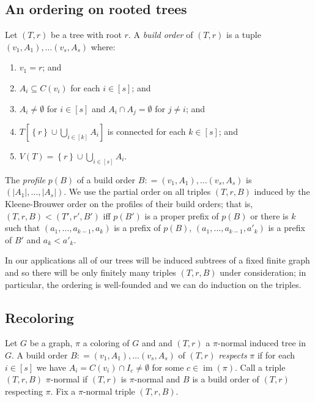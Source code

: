 \documentclass[12pt]{article}
\theoremstyle{plain}
\theoremstyle{definition}
\theoremstyle{remark}
\newcommand{\set}[1]{\left\{ #1 \right\}}
\newcommand{\card}[1]{\left|#1\right|}
\newcommand{\irange}[1]{\left[#1\right]}
\newcommand{\brackets}[1]{\left[ #1 \right]}
\newcommand{\DefinedAs}{\mathrel{\mathop:}=}
\newcommand{\im}{\operatorname{im}}
\begin{document}
\subsection{An ordering on rooted trees}
Let $(T,r)$ be a tree with root $r$.  A \emph{build order} of $(T,r)$ is a tuple $(v_1,A_1), \ldots (v_s, A_s)$ where:
\begin{enumerate}
\item $v_1 = r$; and
\item $A_i \subseteq C(v_i)$ for each $i \in \irange{s}$; and
\item $A_i \neq \emptyset$ for $i \in \irange{s}$ and $A_i \cap A_j = \emptyset$ for $j \neq i$; and
\item $T\brackets{\set{r} \cup \bigcup_{i \in \irange{k}} A_i}$ is connected for each $k \in \irange{s}$; and
\item $V(T) = \set{r} \cup \bigcup_{i \in \irange{s}} A_i$.
\end{enumerate}

The \emph{profile} $p(B)$ of a build order $B \DefinedAs (v_1,A_1), \ldots (v_s, A_s)$ is $(\card{A_1}, \ldots, \card{A_s})$. We use the partial order on all triples $(T, r, B)$ induced by the Kleene-Brouwer order on the profiles of their build orders; that is, $(T, r, B) < (T', r', B')$ iff $p(B')$ is a proper prefix of $p(B)$ or there is $k$ such that $(a_1, \ldots, a_{k-1}, a_k)$ is a prefix of $p(B)$, $(a_1, \ldots, a_{k-1}, a'_k)$ is a prefix of $B'$ and $a_k < a'_k$.

In our applications all of our trees will be induced subtrees of a fixed finite graph and so there will be only finitely many triples $(T, r, B)$ under consideration; in particular, the ordering is well-founded and we can do induction on the triples.

\subsection{Recoloring}
Let $G$ be a graph, $\pi$ a coloring of $G$ and and $(T, r)$ a $\pi$-normal induced tree in $G$.  A build order $B \DefinedAs (v_1,A_1), \ldots (v_s, A_s)$ of $(T,r)$ \emph{respects} $\pi$ if for each $i \in \irange{s}$ we have $A_i = C(v_i) \cap I_c \neq \emptyset$ for some $c \in \im(\pi)$.  Call a triple $(T, r, B)$ $\pi$-normal if $(T, r)$ is $\pi$-normal and $B$ is a build order of $(T,r)$ respecting $\pi$. Fix a $\pi$-normal triple $(T,r, B)$.  
\end{document}
